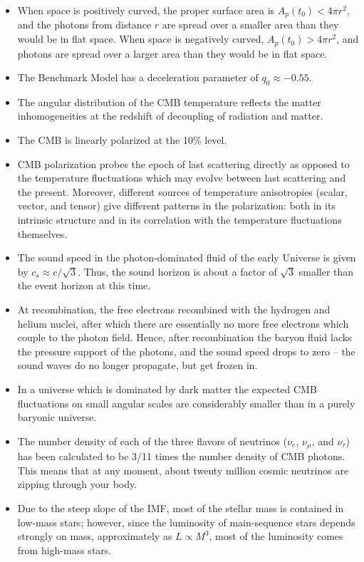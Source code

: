 \documentclass[a4paper,11pt]{article}
\begin{document}
\begin{itemize}
    \item When space is positively curved, the proper surface area is $A_p(t_0) < 4\pi r^2$, and the photons from distance $r$ are spread over a smaller area than they would be in flat space. When space is negatively curved, $A_p(t_0) > 4\pi r^2$, and photons are spread over a larger area than they would be in flat space.
    \item The Benchmark Model has a deceleration parameter of $q_0\approx−0.55$.
    \item The angular distribution of the CMB temperature reflects the matter inhomogeneities at the redshift of decoupling of radiation and matter.
    \item The CMB is linearly polarized at the 10\% level.
    \item CMB polarization probes the epoch of last scattering directly as opposed to the temperature fluctuations which may evolve between last scattering and the present. Moreover, different sources of temperature anisotropies (scalar, vector, and tensor) give different patterns in the polarization: both in its intrinsic structure and in its correlation with the temperature fluctuations themselves.
    \item The sound speed in the photon-dominated fluid of the early Universe is given by $c_s\approx c/\sqrt{3}$. Thus, the sound horizon is about a factor of $\sqrt{3}$ smaller than the event horizon at this time.
    \item At recombination, the free electrons recombined with the hydrogen and helium nuclei, after which there are essentially no more free electrons which couple to the photon field. Hence, after recombination the baryon fluid lacks the pressure support of the photons, and the sound speed drops to zero -- the sound waves do no longer propagate, but get frozen in.
    \item In a universe which is dominated by dark matter the expected CMB fluctuations on small angular scales are considerably smaller than in a purely baryonic universe.
    \item The number density of each of the three flavors of neutrinos ($\nu_e$, $\nu_\mu$, and $\nu_\tau$) has been calculated to be 3/11 times the number density of CMB photons. This means that at any moment, about twenty million cosmic neutrinos are zipping through your body.
    \item Due to the steep slope of the IMF, most of the stellar mass is contained in low-mass stars; however, since the luminosity of main-sequence stars depends strongly on mass, approximately as $L\propto M^3$, most of the luminosity comes from high-mass stars.

\end{itemize}
\end{document}
